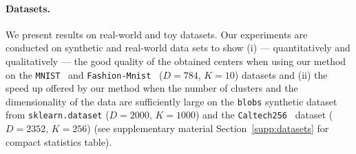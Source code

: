 \paragraph{Datasets.}
We present results on real-world and toy datasets.
Our experiments are conducted on synthetic and real-world data sets to show (i) --- quantitatively and qualitatively --- the good quality of the obtained centers when using our method on the \texttt{MNIST}~\cite{lecun-mnisthandwrittendigit-2010} and \texttt{Fashion-Mnist}~\cite{Pedregosa2011Scikit} %
($D=784$, $K=10$) datasets and (ii) the speed up offered by our method \qkmeans when the number of clusters and the dimensionality of the data are sufficiently large on the \texttt{blobs} synthetic dataset from \texttt{sklearn.dataset}  ($D=2000$, $K=1000$) and the \texttt{Caltech256}~\cite{griffin2007caltech} dataset ($D=2352$, $K=256$) (see supplementary material Section~\ref{supp:datasets} for compact statistics table).


